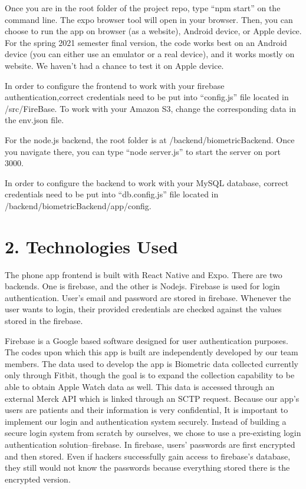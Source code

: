 \documentclass[]{book}
\begin{document}
Once you are in the root folder of the project repo, type ``npm start''
on the command line. The expo browser tool will open in your browser.
Then, you can choose to run the app on browser (as a website), Android
device, or Apple device. For the spring 2021 semester final version, the
code works best on an Android device (you can either use an emulator or
a real device), and it works mostly on website. We haven't had a chance
to test it on Apple device.

In order to configure the frontend to work with your firebase
authentication,correct credentials need to be put into ``config.js''
file located in /src/FireBase. To work with your Amazon S3, change the
corresponding data in the env.json file.

For the node.js backend, the root folder is at
/backend/biometricBackend. Once you navigate there, you can type ``node
server.js'' to start the server on port 3000.

In order to configure the backend to work with your MySQL database,
correct credentials need to be put into ``db.config.js'' file located in
/backend/biometricBackend/app/config.

\section{2. Technologies Used}\label{technologies-used}

The phone app frontend is built with React Native and Expo. There are
two backends. One is firebase, and the other is Nodejs. Firebase is used
for login authentication. User's email and password are stored in
firebase. Whenever the user wants to login, their provided credentials
are checked against the values stored in the firebase.

Firebase is a Google based software designed for user authentication
purposes. The codes upon which this app is built are independently
developed by our team members. The data used to develop the app is
Biometric data collected currently only through Fitbit, though the goal
is to expand the collection capability to be able to obtain Apple Watch
data as well. This data is accessed through an external Merck API which
is linked through an SCTP request. Because our app's users are patients
and their information is very confidential, It is important to implement
our login and authentication system securely. Instead of building a
secure login system from scratch by ourselves, we chose to use a
pre-existing login authentication solution--firebase. In firebase,
users' passwords are first encrypted and then stored. Even if hackers
successfully gain access to firebase's database, they still would not
know the passwords because everything stored there is the encrypted
version.
\end{document}
